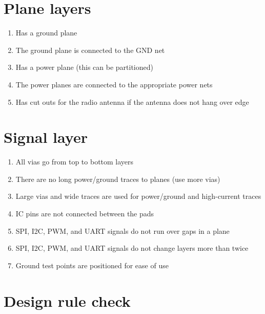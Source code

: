 \documentclass[a4paper, 12pt]{article}
\begin{document}
\pagebreak

\section*{Plane layers}

\begin{enumerate}
\item Has a ground plane

\item The ground plane is connected to the GND net

\item Has a power plane (this can be partitioned)

\item The power planes are connected to the appropriate power nets

\item Has cut outs for the radio antenna if the antenna does not hang
  over edge
\end{enumerate}


\section*{Signal layer}

\begin{enumerate}
\item All vias go from top to bottom layers

\item There are no long power/ground traces to planes (use more vias)

\item Large vias and wide traces are used for power/ground and
  high-current traces

\item IC pins are not connected between the pads

\item SPI, I2C, PWM, and UART signals do not run over gaps in a plane

\item SPI, I2C, PWM, and UART signals do not change layers more than twice

\item Ground test points are positioned for ease of use
\end{enumerate}


\section*{Design rule check}
\end{document}
